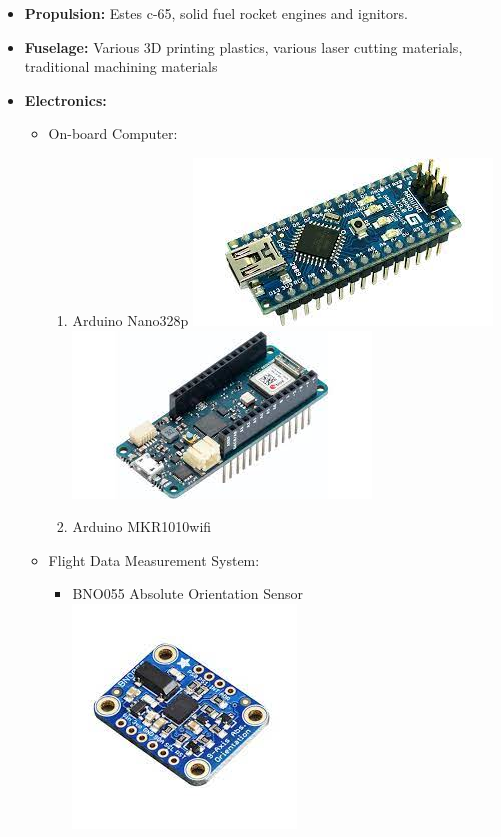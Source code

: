 \documentclass[12pt]{article}
\begin{document}
\begin{description}[labelindent=1cm]
\begin{itemize}
	\item {\bf Propulsion:} Estes c-65, solid fuel rocket  engines and ignitors.
	\item {\bf Fuselage:} Various 3D printing plastics, various laser cutting materials, traditional machining materials
	\item {\bf Electronics:}
		\begin{itemize}
			\item On-board Computer: 
				\begin{enumerate}
					\item Arduino Nano328p 
					 \hspace*{2cm}\includegraphics[scale=.3]{arduino_nano.jpeg}
					 \hspace*{0.5cm}\includegraphics[scale=.3]{arduino_mkr.jpeg}
					\item Arduino MKR1010wifi
				\end{enumerate}
			\item Flight Data Measurement System:
				\begin{itemize}
					\item BNO055 Absolute Orientation Sensor 
					\hspace*{0.5cm}\includegraphics[scale=.3]{bno_055.jpeg}

\end{itemize}
\end{itemize}
\end{itemize}
\end{description}
\end{document}

